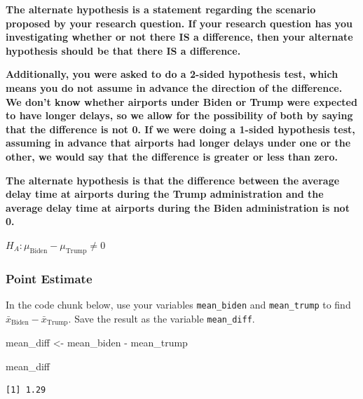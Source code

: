 \documentclass[
  letterpaper,
  DIV=11,
  numbers=noendperiod]{scrartcl}
\newenvironment{Shaded}{\begin{snugshade}}{\end{snugshade}}
\newcommand{\NormalTok}[1]{\textcolor[rgb]{0.00,0.23,0.31}{#1}}
\newcommand{\OtherTok}[1]{\textcolor[rgb]{0.00,0.23,0.31}{#1}}
\newcommand{\SpecialCharTok}[1]{\textcolor[rgb]{0.37,0.37,0.37}{#1}}
\begin{document}
\begin{tcolorbox}[enhanced jigsaw, toprule=.15mm, breakable, leftrule=.75mm, bottomrule=.15mm, rightrule=.15mm, colback=white, opacityback=0, colframe=quarto-callout-warning-color-frame, left=2mm, arc=.35mm]

\textbf{The alternate hypothesis is a statement regarding the scenario
proposed by your research question. If your research question has you
investigating whether or not there IS a difference, then your alternate
hypothesis should be that there IS a difference.}

\textbf{Additionally, you were asked to do a 2-sided hypothesis test,
which means you do not assume in advance the direction of the
difference. We don't know whether airports under Biden or Trump were
expected to have longer delays, so we allow for the possibility of both
by saying that the difference is not 0. If we were doing a 1-sided
hypothesis test, assuming in advance that airports had longer delays
under one or the other, we would say that the difference is greater or
less than zero.}

\textbf{The alternate hypothesis is that the difference between the
average delay time at airports during the Trump administration and the
average delay time at airports during the Biden administration is not
0.}

\(H_A \colon \mu_{\text{Biden}}-\mu_{\text{Trump}} \ne 0\)

\end{tcolorbox}

\subsubsection{Point Estimate}\label{point-estimate-1}

In the code chunk below, use your variables \texttt{mean\_biden} and
\texttt{mean\_trump} to find
\(\bar{x}_{\text{Biden}}-\bar{x}_{\text{Trump}}\). Save the result as
the variable \texttt{mean\_diff}.

\begin{Shaded}
\begin{Highlighting}[]
\NormalTok{mean\_diff }\OtherTok{\textless{}{-}}\NormalTok{ mean\_biden }\SpecialCharTok{{-}}\NormalTok{ mean\_trump}

\NormalTok{mean\_diff}
\end{Highlighting}
\end{Shaded}

\begin{verbatim}
[1] 1.29
\end{verbatim}
\end{document}
